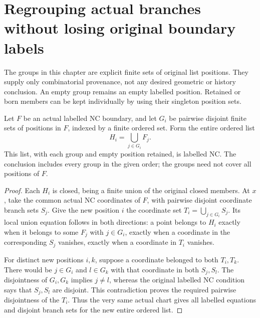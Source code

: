 \section{Regrouping actual branches without losing original boundary labels}
\label{sec:nc-labelled-boundary-regrouping}

The groups in this chapter are explicit finite sets of original list
positions. They supply only combinatorial provenance, not any desired
geometric or history conclusion. An empty group remains an empty
labelled position. Retained or born members can be kept individually by
using their singleton position sets.

\begin{theorem}
\label{hir:labelled-nc-actual-disjoint-regrouping}
\leanok
Let $F$ be an actual labelled NC boundary, and let $G_i$ be pairwise
disjoint finite sets of positions in $F$, indexed by a finite ordered
set. Form the entire ordered list
\[
                   H_i=\bigcup_{j\in G_i}F_j.
\]
This list, with each group and empty position retained, is labelled NC.
The conclusion includes every group in the given order; the groups
need not cover all positions of $F$.
\end{theorem}
\begin{proof}
Each $H_i$ is closed, being a finite union of the original closed
members. At $x$, take the common actual NC coordinates of $F$, with
pairwise disjoint coordinate branch sets $S_j$. Give the new position
$i$ the coordinate set $T_i=\bigcup_{j\in G_i}S_j$. Its local union
equation follows in both directions: a point belongs to $H_i$ exactly
when it belongs to some $F_j$ with $j\in G_i$, exactly when a
coordinate in the corresponding $S_j$ vanishes, exactly when a
coordinate in $T_i$ vanishes.

For distinct new positions $i,k$, suppose a coordinate belonged to both
$T_i,T_k$. There would be $j\in G_i$ and $l\in G_k$ with that
coordinate in both $S_j,S_l$. The disjointness of $G_i,G_k$ implies
$j\ne l$, whereas the original labelled NC condition says that
$S_j,S_l$ are disjoint. This contradiction proves the required
pairwise disjointness of the $T_i$. Thus the very same actual chart
gives all labelled equations and disjoint branch sets for the new
entire ordered list.
\end{proof}

